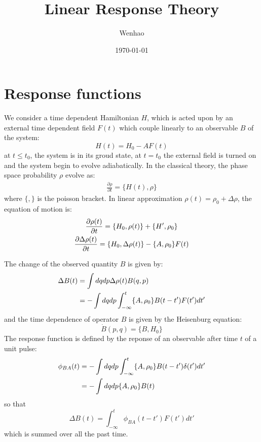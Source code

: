 \documentclass{article}
\begin{document}
\title{Linear Response Theory}
\author{Wenhao}
\date{\today}
\maketitle

\section{Response functions}
We consider a time dependent Hamiltonian $H$, which is acted upon by an external time dependent field
$F(t)$ which couple linearly to an observable $B$ of the system:
\begin{equation}
    H(t) = H_0 - AF(t)
\end{equation} 
at $t \le t_0$, the system is in its groud state, at $t = t_0$ the external field is turned on and 
the system begin to evolve adiabatically. 
In the classical theory, the phase space probability $\rho$ evolve as:
\begin{eqnarray}
    \frac{\partial \rho}{\partial t} = \{ H(t), \rho\}
\end{eqnarray}
where $\{,\}$ is the poisson bracket. 
In linear approximation $\rho(t) = \rho_0 + \Delta \rho$, the equation of motion is:
\begin{gather}
    \frac{\partial \rho(t)}{\partial t} = \{ H_0, \rho(t)\} + \{H', \rho_0\} \notag \\
    \frac{\partial \Delta \rho(t)}{\partial t} = \{ H_0, \Delta \rho(t)\} - \{A, \rho_0\}F(t) \notag \\
\end{gather}

The change of the observed quantity $B$ is given by:
\begin{align}
    \Delta B(t) &= \int dqdp \Delta \rho(t) B(q,p) \notag \\
               &= -\int dqdp \int_{-\infty}^{t} \{A, \rho_0\} B(t-t') F(t') dt'
\end{align}
and the time dependence of operator $B$ is given by the Heisenburg equation:
\begin{equation}
    \dot{B}(p,q) = \{B,H_0\}
\end{equation}
The response function is defined by the reponse of an observable after time $t$ of a unit pulse:
\begin{align}
    \phi_{BA} (t) &= -\int dqdp \int_{-\infty}^{t} \{A, \rho_0\} B(t-t') \delta(t') dt' \notag \\
                &= -\int dqdp \{A, \rho_0\} B(t) \label{def_phi_t}
\end{align}
so that 
\begin{equation}
    \Delta B(t) = \int_{-\infty}^{t} \phi_{BA} (t-t') F(t') dt'
\end{equation}
which is summed over all the past time.
\end{document}

